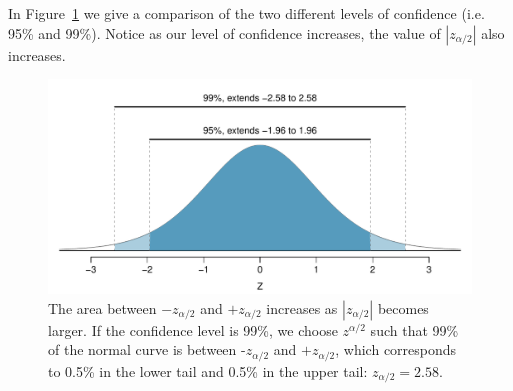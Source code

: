 In Figure~\ref{choosingZForCI} we give a comparison of the two different levels of confidence 
(i.e. 95\% and 99\%).
Notice as our level of confidence increases, the value of $|z_{\alpha/2}|$ also increases.

\begin{figure}[H]
\centering
\includegraphics[width=\textwidth]{04-5/figures/choosingZForCI/choosingZForCI}
\caption{The area between $-z_{\alpha/2}$ and $+z_{\alpha/2}$ increases as $|z_{\alpha/2}|$ becomes larger. If the confidence level is 99\%, we choose $z^{\alpha/2}$ such that 99\% of the normal curve is between -$z_{\alpha/2}$ and $+z_{\alpha/2}$, which corresponds to 0.5\% in the lower tail and 0.5\% in the upper tail: $z_{\alpha/2}=2.58$.}
\label{choosingZForCI}
\end{figure}














